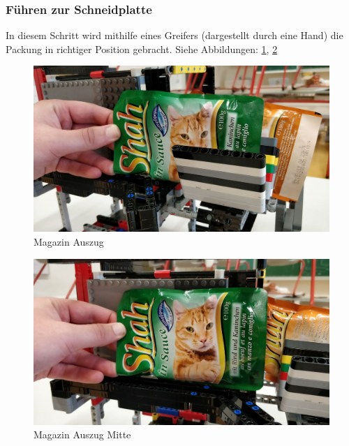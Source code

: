 \newpage 

\subsubsection{Führen zur Schneidplatte}

In diesem Schritt wird mithilfe eines Greifers (dargestellt durch eine Hand) die Packung in richtiger Position gebracht. Siehe Abbildungen: \ref{Magazin Auszug}, \ref{Magazin Mitte}

\begin{figure}[H]
\begin{center}
\includegraphics[width=13cm]{Bilder/Ablauf_1_png/Magazin_Auszug.jpeg}
\caption{Magazin Auszug}
\label{Magazin Auszug}
\end{center}
\end{figure}

\begin{figure}[H]
\begin{center}
\includegraphics[width=13cm]{Bilder/Ablauf_1_png/Magazin_Auszug_2.jpeg}
\caption{Magazin Auszug Mitte}
\label{Magazin Mitte}
\end{center}
\end{figure}

